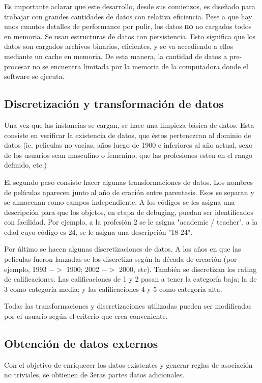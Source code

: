 \documentclass[journal]{IEEEtran}
\begin{document}
Es importante aclarar que este desarrollo, desde sus comienzos,
es diseñado para trabajar con grandes cantidades de datos con relativa
eficiencia. Pese a que hay unos cuantos detalles de performance por pulir,
los datos \textbf{no} no cargados todos en memoria. Se usan estructuras
de datos con persistencia. Esto significa que los datos son cargados
archivos binarios, eficientes, y se va accediendo a ellos mediante
un cache en memoria. De esta manera, la cantidad de datos a pre-procesar
no se encuentra limitada por la memoria de la computadora donde
el software se ejecuta.

\subsection{Discretización y transformación de datos}
Una vez que las instancias se cargan, se hace una limpieza básica de datos.
Esta consiste en verificar la existencia de datos, que éstos pertenezcan
al dominio de datos (ie. peliculas no vacias, años luego de 1900 e inferiores
al año actual, sexo de los usuarios sean masculino o femenino, que las
profesiones esten en el rango definido, etc.)

El segundo paso consiste hacer algunas transformaciones de datos. Los nombres
de películas aparecen junto al año de cración entre parentesis. Esos se 
separan y se almacenan como campos independiente. A los códigos se les
asigna una descripción para que los objetos, en etapa de debuging,
puedan ser identificados con facilidad. Por ejemplo, a la profesión 2 se 
le asigna "academic / teacher", a la edad cuyo código es 24, se le asigna
una descripción "18-24".

Por último se hacen algunas discretizaciones de datos. A los años en que
las películas fueron lanzadas se los discretiza según la década de creación
 (por ejemplo, 1993 $-$$>$ 1900; 2002 $-$$>$ 2000, etc). 
También se discretizan los rating de calificaciones. Las calificaciones de
1 y 2 pasan a tener la categoría baja; la de 3 como categoría media; y las
calificaciones 4 y 5 como categoría alta. 

Todas las transformaciones y discretizaciones utilizadas pueden ser modificadas
por el usuario según el criterio que crea conveniente. 



\subsection{Obtención de datos externos}
Con el objetivo de enriquecer los datos existentes y generar reglas de asociación
no triviales, se obtienen de 3eras partes datos adicionales.
\end{document}
